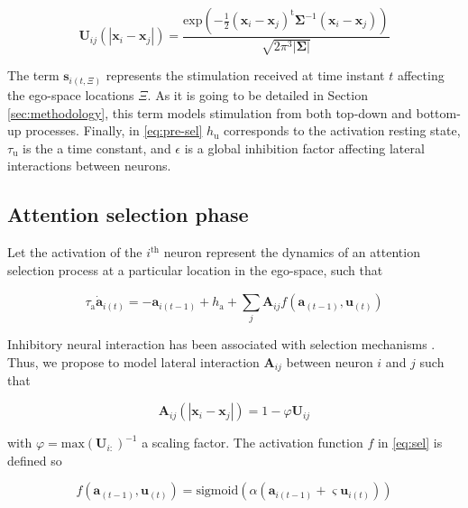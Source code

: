 \documentclass[letterpaper, 10 pt, conference]{ieeeconf}  %
\begin{document}
	\begin{equation}
		\mathbf{U}_{ij}(|\mathbf{x}_i-\mathbf{x}_j|) = \frac{\mathrm{exp}\left(-\frac{1}{2} (\mathbf{x}_i-\mathbf{x}_j)^{\mathrm{t}}\mathbf{\Sigma}^{-1}(\mathbf{x}_i-\mathbf{x}_j)\right)}{\sqrt{2\pi^{3}|\mathbf{\Sigma}|}}	
	\label{eq:pre-sel-syn}
	\end{equation}
	
	The term $\mathbf{s}_{i(t,\Xi)}$ represents the stimulation received at time instant $t$ affecting the ego-space locations $\Xi$. As it is going to be detailed in Section \ref{sec:methodology}, this term models stimulation from both top-down and bottom-up processes. Finally, in \eqref{eq:pre-sel} $h_\mathrm{u}$ corresponds to the activation resting state, $\tau_\mathrm{u}$ is the a time constant, and $\epsilon$ is a global inhibition factor affecting lateral interactions between neurons.
	 
	\subsection{Attention selection phase}
	
	Let the activation of the $i^\mathrm{th}$ neuron represent the dynamics of an attention selection process at a particular location in the ego-space, such that 
	
	\begin{equation}
	\tau_\mathrm{a} \dot{\mathbf{a}}_{i(t)} = -\mathbf{a}_{i(t-1)} + h_\mathrm{a} + \sum_{j}^{} \mathbf{A}_{ij}f\left(\mathbf{a}_{(t-1)}, \mathbf{u}_{(t)}\right) 
	\label{eq:sel}
	\end{equation}
	
	\noindent Inhibitory neural interaction has been associated with selection mechanisms \cite{schoner2016}. Thus, we propose to model lateral interaction $\mathbf{A}_{ij}$ between neuron $i$ and $j$ such that

	\begin{equation}
	\mathbf{A}_{ij}(|\mathbf{x}_i-\mathbf{x}_j|) = 1 - \varphi\mathbf{U}_{ij}	
	\label{eq:sel-syn}
	\end{equation}
	
	\noindent with $\varphi = \mathrm{max}(\mathbf{U}_{i:})^{-1}$ a scaling factor. The activation function $f$ in \eqref{eq:sel} is defined so

	\begin{equation}
	f\left(\mathbf{a}_{(t-1)}, \mathbf{u}_{(t)}\right) = \mathrm{sigmoid} \left(\alpha \left(\mathbf{a}_{i(t-1)} + \varsigma \mathbf{u}_{i(t)}\right)\right)
	\label{eq:sel-fa}
	\end{equation}
	
\end{document}
